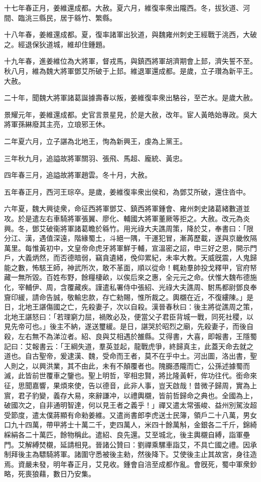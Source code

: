\begin{pinyinscope}
十七年春正月，姜維還成都。大赦。夏六月，維復率衆出隴西。冬，拔狄道、河間、臨洮三縣民，居于緜竹、繁縣。

十八年春，姜維還成都。夏，復率諸軍出狄道，與魏雍州刺史王經戰于洮西，大破之。經退保狄道城，維却住鍾題。

十九年春，進姜維位為大將軍，督戎馬，與鎮西將軍胡濟期會上邽，濟失誓不至。秋八月，維為魏大將軍鄧艾所破于上邽。維退軍還成都。是歲，立子瓚為新平王。大赦。

二十年，聞魏大將軍諸葛誕據壽春以叛，姜維復率衆出駱谷，至芒水。是歲大赦。

景耀元年，姜維還成都。史官言景星見，於是大赦，改年。宦人黃皓始專政。吳大將軍孫綝廢其主亮，立琅邪王休。

二年夏六月，立子諶為北地王，恂為新興王，虔為上黨王。

三年秋九月，追謚故將軍關羽、張飛、馬超、龐統、黃忠。

四年春三月，追謚故將軍趙雲。冬十月，大赦。

五年春正月，西河王琮卒。是歲，姜維復率衆出侯和，為鄧艾所破，還住沓中。

六年夏，魏大興徒衆，命征西將軍鄧艾、鎮西將軍鍾會、雍州刺史諸葛緒數道並攻。於是遣左右車騎將軍張翼、廖化、輔國大將軍董厥等拒之。大赦。改元為炎興。冬，鄧艾破衞將軍諸葛瞻於緜竹。用光祿大夫譙周策，降於艾，奉書曰：「限分江、漢，遇值深遠，階緣蜀土，斗絕一隅，干運犯冒，漸苒歷載，遂與京畿攸隔萬里。每惟黃初中，文皇帝命虎牙將軍鮮于輔，宣溫密之詔，申三好之恩，開示門戶，大義炳然，而否德暗弱，竊貪遺緒，俛仰累紀，未率大教。天威旣震，人鬼歸能之數，怖駭王師，神武所次，敢不革面，順以從命！輒勑羣帥投戈釋甲，官府帑藏一無所毀。百姓布野，餘糧棲畝，以俟后來之惠，全元元之命。伏惟大魏布德施化，宰輔伊、周，含覆藏疾。謹遣私署侍中張紹、光祿大夫譙周、駙馬都尉鄧良奉齎印緩，請命告誠，敬輸忠款，存亡勑賜，惟所裁之。輿櫬在近，不復縷陳。」是日，北地王諶傷國之亡，先殺妻子，次以自殺。漢晉春秋曰：後主將從譙周之策，北地王諶怒曰：「若理窮力屈，禍敗必及，便當父子君臣背城一戰，同死社稷，以見先帝可也。」後主不納，遂送璽緩。是日，諶哭於昭烈之廟，先殺妻子，而後自殺，左右無不為涕泣者。紹、良與艾相遇於雒縣。艾得書，大喜，即報書，王隱蜀記曰：艾報書云：「王綱失道，羣英並起，龍戰虎爭，終歸真主，此蓋天命去就之道也。自古聖帝，爰逮漢、魏，受命而王者，莫不在乎中土。河出圖，洛出書，聖人則之，以興洪業，其不由此，未有不顛覆者也。隗嚻憑隴而亡，公孫述據蜀而滅，此皆前世覆車之鑒也。聖上明哲，宰相忠賢，將比隆黃軒，侔功往代。銜命來征，思聞嘉響，果煩來使，告以德音，此非人事，豈天啟哉！昔微子歸周，實為上賔，君子豹變，義存大易，來辭謙冲，以禮輿櫬，皆前哲歸命之典也。全國為上，破國次之，自非通明智達，何以見王者之義乎！」禪又遣太常張峻、益州別駕汝超受節度，遣太僕蔣顯有命勑姜維。又遣尚書郎李虎送士民簿，領戶二十八萬，男女口九十四萬，帶甲將士十萬二千，吏四萬人，米四十餘萬斛，金銀各二千斤，錦綺綵絹各二十萬匹，餘物稱此。遣紹、良先還。艾至城北，後主輿櫬自縛，詣軍壘門。艾解縛焚櫬，延請相見。晉諸公贊曰：劉禪乘騾車詣艾，不具亡國之禮。因承制拜後主為驃騎將軍。諸圍守悉被後主勑，然後降下。艾使後主止其故宮，身往造焉。資嚴未發，明年春正月，艾見收。鍾會自涪至成都作亂。會旣死，蜀中軍衆鈔略，死喪狼藉，數日乃安集。


\end{pinyinscope}
